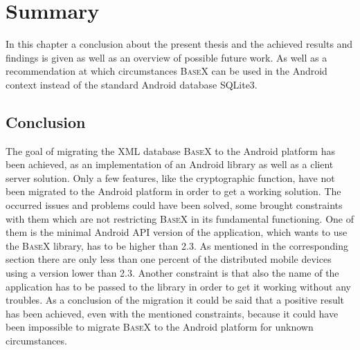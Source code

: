 \chapter{Summary}
\label{cha:summery}
In this chapter a conclusion about the present thesis and the achieved results and findings is given as well as an overview of possible future work.
As well as a recommendation at which circumstances \textsc{BaseX} can be used in the Android context instead of the standard Android database SQLite3.
\section{Conclusion}
\label{sec:summery:conclusion}
The goal of migrating the XML database \textsc{BaseX} to the Android platform has been achieved, as an implementation of an Android library as well as a client server solution.
Only a few features, like the cryptographic function, have not been migrated to the Android platform in order to get a working solution.
The occurred issues and problems could have been solved, some brought constraints with them which are not restricting \textsc{BaseX} in its fundamental functioning.
One of them is the minimal Android API version of the application, which wants to use the \textsc{BaseX} library, has to be higher than 2.3.
As mentioned in the corresponding section there are only less than one percent of the distributed mobile devices using a version lower than 2.3.
Another constraint is that also the name of the application has to be passed to the library in order to get it working without any troubles.
As a conclusion of the migration it could be said that a positive result has been achieved, even with the mentioned constraints, because it could have been impossible to migrate \textsc{BaseX} to the Android platform for unknown circumstances.





